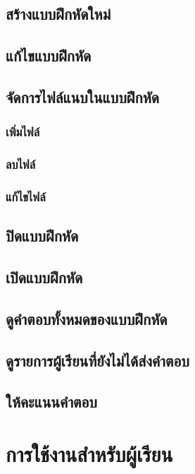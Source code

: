 \documentclass[12pt,oneside]{book}
\begin{document}
\subsection{สร้างแบบฝึกหัดใหม่}

\subsection{แก้ไขแบบฝึกหัด}

\subsection{จัดการไฟล์แนบในแบบฝึกหัด}

\subsubsection{เพิ่มไฟล์}

\subsubsection{ลบไฟล์}

\subsubsection{แก้ไขไฟล์}

\subsection{ปิดแบบฝึกหัด}

\subsection{เปิดแบบฝึกหัด}

\subsection{ดูคำตอบทั้งหมดของแบบฝึกหัด}

\subsection{ดูรายการผู้เรียนที่ยังไม่ได้ส่งคำตอบ}

\subsection{ให้คะแนนคำตอบ}

\section{การใช้งานสำหรับผู้เรียน}
\end{document}
